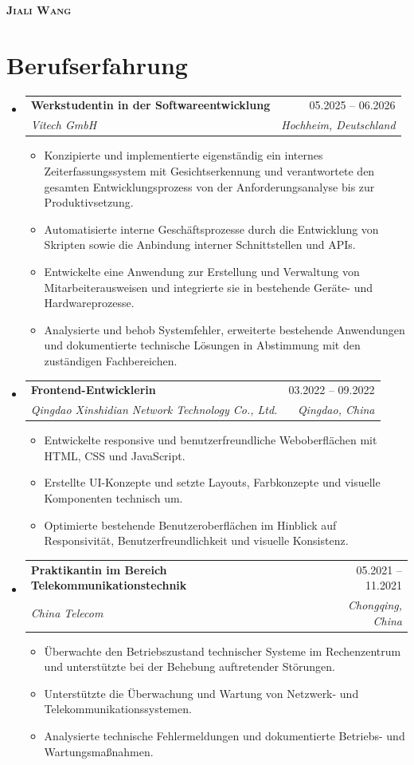 \documentclass[a4paper,11pt]{article}
\makeatletter
\newcommand{\resumeItem}[1]{
  \item\small{{#1 \vspace{-2pt}}}
}
\newcommand{\resumeSubheading}[4]{
  \vspace{-2pt}\item
  \begin{tabular*}{0.97\textwidth}[t]{l@{\extracolsep{\fill}}r}
    \textbf{#1} & #2 \\
    \textit{\small#3} & \textit{\small #4} \\
  \end{tabular*}\vspace{-7pt}
}
\newcommand{\resumeSubHeadingListStart}{\begin{itemize}[leftmargin=0.15in,label={}]}
\newcommand{\resumeSubHeadingListEnd}{\end{itemize}}
\newcommand{\resumeItemListStart}{\begin{itemize}}
\newcommand{\resumeItemListEnd}{\end{itemize}\vspace{-5pt}}
\makeatother
\begin{document}
\begin{center}
  \textbf{\Huge \scshape Jiali Wang} \\ \vspace{1pt}
  \small %
  \small %
\end{center}

\section{Berufserfahrung}
\resumeSubHeadingListStart
  \resumeSubheading
    {Werkstudentin in der Softwareentwicklung}{05.2025 -- 06.2026}
    {Vitech GmbH}{Hochheim, Deutschland}
    \resumeItemListStart
      \resumeItem{Konzipierte und implementierte eigenständig ein internes Zeiterfassungssystem mit Gesichtserkennung und verantwortete den gesamten Entwicklungsprozess von der Anforderungsanalyse bis zur Produktivsetzung.}
      \resumeItem{Automatisierte interne Geschäftsprozesse durch die Entwicklung von Skripten sowie die Anbindung interner Schnittstellen und APIs.}
      \resumeItem{Entwickelte eine Anwendung zur Erstellung und Verwaltung von Mitarbeiterausweisen und integrierte sie in bestehende Geräte- und Hardwareprozesse.}
      \resumeItem{Analysierte und behob Systemfehler, erweiterte bestehende Anwendungen und dokumentierte technische Lösungen in Abstimmung mit den zuständigen Fachbereichen.}
    \resumeItemListEnd
  \resumeSubheading
    {Frontend-Entwicklerin}{03.2022 -- 09.2022}
    {Qingdao Xinshidian Network Technology Co., Ltd.}{Qingdao, China}
    \resumeItemListStart
      \resumeItem{Entwickelte responsive und benutzerfreundliche Weboberflächen mit HTML, CSS und JavaScript.}
      \resumeItem{Erstellte UI-Konzepte und setzte Layouts, Farbkonzepte und visuelle Komponenten technisch um.}
      \resumeItem{Optimierte bestehende Benutzeroberflächen im Hinblick auf Responsivität, Benutzerfreundlichkeit und visuelle Konsistenz.}
    \resumeItemListEnd
  \resumeSubheading
    {Praktikantin im Bereich Telekommunikationstechnik}{05.2021 -- 11.2021}
    {China Telecom}{Chongqing, China}
    \resumeItemListStart
      \resumeItem{Überwachte den Betriebszustand technischer Systeme im Rechenzentrum und unterstützte bei der Behebung auftretender Störungen.}
      \resumeItem{Unterstützte die Überwachung und Wartung von Netzwerk- und Telekommunikationssystemen.}
      \resumeItem{Analysierte technische Fehlermeldungen und dokumentierte Betriebs- und Wartungsmaßnahmen.}
    \resumeItemListEnd
\resumeSubHeadingListEnd
\end{document}
